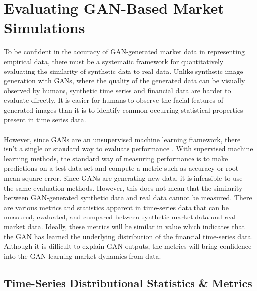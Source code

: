 \section{Evaluating GAN-Based Market Simulations}
To be confident in the accuracy of GAN-generated market data in representing empirical data, there must be a systematic framework for quantitatively evaluating the similarity of synthetic data to real data. Unlike synthetic image generation with GANs, where the quality of the generated data can be visually observed by humans, synthetic time series and financial data are harder to evaluate directly. It is easier for humans to observe the facial features of generated images than it is to identify common-occurring statistical properties present in time series data.
\\
\\
However, since GANs are an unsupervised machine learning framework, there isn't a single or standard way to evaluate performance \cite{dh-simulating-equity}. With supervised machine learning methods, the standard way of measuring performance is to make predictions on a test data set and compute a metric such as accuracy or root mean square error. Since GANs are generating new data, it is infeasible to use the same evaluation methods. However, this does not mean that the similarity between GAN-generated synthetic data and real data cannot be measured. There are various metrics and statistics apparent in time-series data that can be measured, evaluated, and compared between synthetic market data and real market data. Ideally, these metrics will be similar in value which indicates that the GAN has learned the underlying distribution of the financial time-series data. Although it is difficult to explain GAN outputs, the metrics will bring confidence into the GAN learning market dynamics from data.

\subsection{Time-Series Distributional Statistics \& Metrics}

